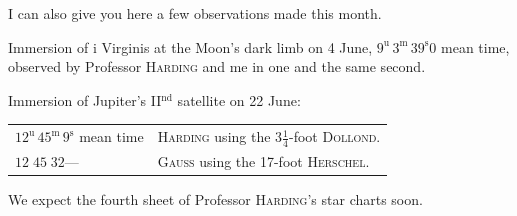 I can also give you here a few observations made this month.

\par\indent Immersion of i Virginis at the Moon’s dark limb on 4 June, $9^{\text{u}}\,3^{\text{m}}\,39^{\text{s}}0$ mean time, observed by Professor \textsc{Harding} and me in one and the same second.

\par\indent Immersion of Jupiter’s II$^{\text{nd}}$ satellite on 22 June:


\begin{center}\fontsize{10}{12}\selectfont\setlength{\tabcolsep}{3pt}\renewcommand{\arraystretch}{1.15}\begin{tabular}{ll}
$12^{\text{u}}\,45^{\text{m}}\,9^{\text{s}}$ mean time & \textsc{Harding} using the $3\frac{1}{4}$-foot \textsc{Dollond}.\\
$12\;45\;32$\quad — & \textsc{Gauss} using the 17-foot \textsc{Herschel}.\\
\end{tabular}\end{center}


\par\indent We expect the fourth sheet of Professor \textsc{Harding}’s star charts soon.

